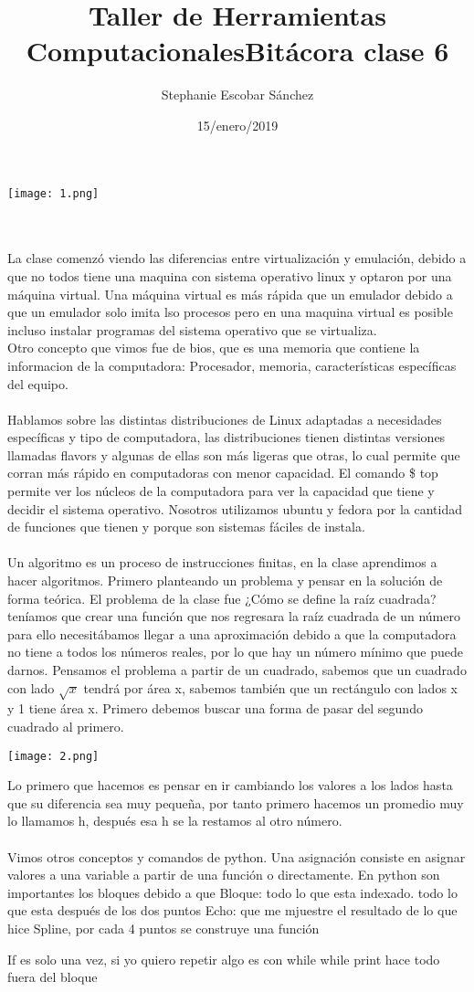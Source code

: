 \documentclass{article}
\title{\Huge Taller de Herramientas Computacionales}
\author{Stephanie Escobar Sánchez}
\date{15/enero/2019}
\begin{document}
	\maketitle
\begin{center}
	\texttt{[image: 1.png]}	
\end{center}
\newpage
\title{\Huge Bitácora clase 6} \\
\\
La clase comenzó viendo las diferencias entre virtualización y emulación, debido a que no todos tiene una maquina con sistema operativo linux y optaron por una máquina virtual. Una máquina virtual es más rápida que un emulador debido a que un emulador solo imita lso procesos pero en una maquina virtual es posible incluso instalar programas del sistema operativo que se virtualiza.\\
Otro concepto que vimos fue de bios, que es una memoria que contiene la informacion de la computadora: Procesador, memoria, características específicas del equipo.\\
\\
Hablamos sobre las distintas distribuciones de Linux adaptadas a necesidades específicas y tipo de computadora, las distribuciones tienen distintas versiones llamadas flavors y algunas de ellas son más ligeras que otras, lo cual permite que corran más rápido en computadoras con menor capacidad. El comando \$ top permite ver los núcleos de la computadora para ver la capacidad que tiene y decidir el sistema operativo. Nosotros utilizamos ubuntu y fedora por la cantidad de funciones que tienen y porque son sistemas fáciles de instala.\\
\\
Un algoritmo es un proceso de instrucciones finitas, en la clase aprendimos a hacer algoritmos. Primero planteando un problema y pensar en la solución de forma teórica. El problema de la clase fue ¿Cómo se define la raíz cuadrada? teníamos que crear una función que nos regresara la raíz cuadrada de un número para ello necesitábamos llegar a una aproximación debido a que la computadora no tiene a todos los números reales, por lo que hay un número mínimo que puede darnos.
Pensamos el problema a partir de un cuadrado, sabemos que un cuadrado con lado $\sqrt{x}$ tendrá por área x, sabemos también que un rectángulo con lados x y 1 tiene área x. Primero debemos buscar una forma de pasar del segundo cuadrado al primero.
\begin{center}
	\texttt{[image: 2.png]}	
\end{center}
Lo primero que hacemos es pensar en ir cambiando los valores a los lados hasta que su diferencia sea muy pequeña, por tanto primero hacemos un promedio muy lo llamamos h, después esa h se la restamos al otro número.\\
\\
Vimos otros conceptos y comandos de python. Una asignación consiste en asignar valores a una variable a partir de una función o directamente.
En python son importantes los bloques debido a que 
Bloque: todo lo que esta indexado. todo lo que esta después de los dos puntos
Echo: que me mjuestre el resultado de lo que hice
Spline, por cada 4 puntos se construye una función

If es solo una vez, si yo quiero repetir algo es con while 
while print hace todo fuera del bloque
\end{document}
